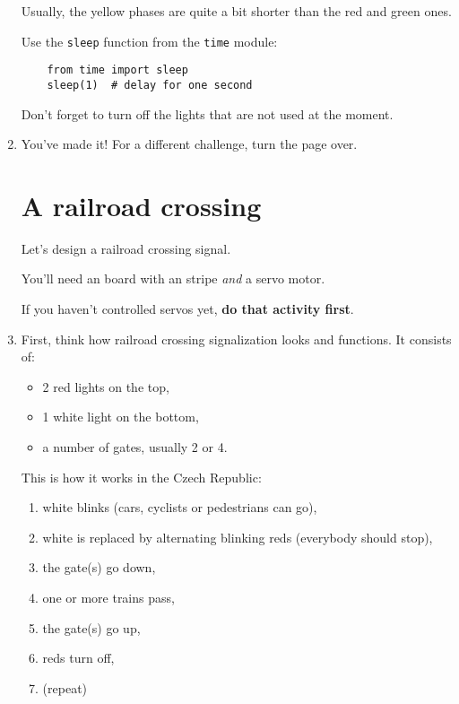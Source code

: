 \documentclass{../tutorial}
\begin{document}
\begin{enumerate}
    Usually, the yellow phases are quite a bit shorter than
    the red and green ones.

    Use the \lstinline|sleep| function from the \lstinline|time| module:

    \begin{lstlisting}
    from time import sleep
    sleep(1)  # delay for one second
    \end{lstlisting}

    Don't forget to turn off the lights that are not used at the moment.

\item
    You've made it!
    For a different challenge, turn the page over.

\clearpage

\section{A railroad crossing}

    Let's design a railroad crossing signal.

    You'll need an  board with an   stripe
    \emph{and} a servo motor.

    If you haven't controlled servos yet, \textbf{do that activity first}.

\item
    First, think how railroad crossing signalization looks and functions.
    It consists of:

    \begin{itemize}
    \item 2 red lights on the top,
    \item 1 white light on the bottom,
    \item a number of gates, usually 2 or 4.
    \end{itemize}

    This is how it works in the Czech Republic:

    \begin{enumerate}
    \item white blinks (cars, cyclists or pedestrians can go),
    \item white is replaced by alternating blinking reds
          (everybody should stop),
    \item the gate(s) go down,
    \item one or more trains pass,
    \item the gate(s) go up,
    \item reds turn off,
    \item (repeat)
    \end{enumerate}


\end{enumerate}
\end{document}
